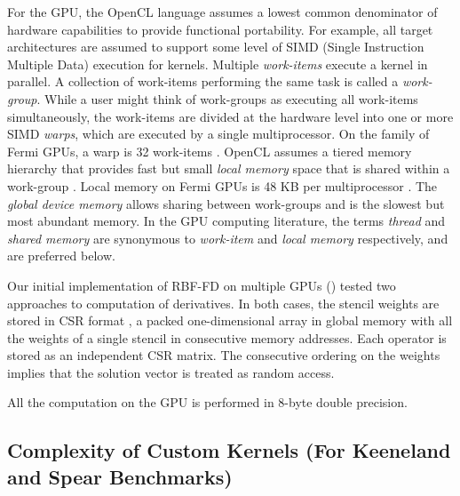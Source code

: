 \documentclass{report}
\begin{document}
For the GPU, the OpenCL language \cite{OpenCL2009} assumes a lowest common denominator of hardware capabilities to provide functional portability. For example, all target architectures are assumed to support some level of SIMD (Single Instruction Multiple Data) execution for kernels. Multiple \textit{work-items} execute a kernel in parallel. 
A collection of work-items performing the same task is called a \textit{work-group}. While a user might think of work-groups as executing all work-items simultaneously, the work-items are divided at the hardware level into one or more SIMD \textit{warps}, which are executed by a single multiprocessor. On the family of Fermi GPUs, a warp is 32 work-items \cite{CudaGuide2011}. 
OpenCL assumes a tiered memory hierarchy that provides fast but small \textit{local memory} space that is shared within a work-group \cite{OpenCL2009}. Local memory on Fermi GPUs is 48 KB per multiprocessor \cite{CudaGuide2011}. The \textit{global device memory} allows sharing between work-groups and is the slowest but most abundant memory. 
In the GPU computing literature, the terms \textit{thread} and \textit{shared memory} are synonymous to \textit{work-item} and \textit{local memory} respectively, and are preferred below. 

Our initial implementation of RBF-FD on multiple GPUs (\cite{BolligFlyerErlebacher2012}) tested two approaches to computation of derivatives. 
In both cases, the stencil weights are stored in CSR format \cite{Bell2009}, 
a packed one-dimensional array in global memory with all the weights 
of a single stencil in consecutive memory addresses. Each operator is stored as an independent CSR matrix. The consecutive ordering on the weights implies that the solution vector %
is treated as random access. 

All the computation on the GPU is performed in 8-byte double precision. 



\subsection{Complexity of Custom Kernels (For Keeneland and Spear Benchmarks)}
\end{document}
